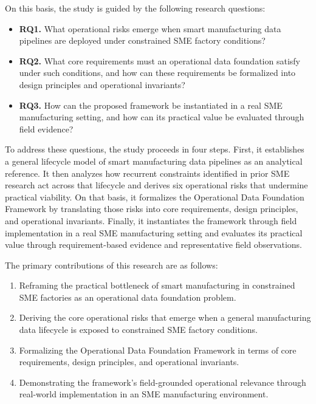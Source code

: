 \documentclass[systems,article,submit,pdftex,moreauthors]{Definitions/mdpi}
\begin{document}
On this basis, the study is guided by the following research questions:

\begin{itemize}
    \item \textbf{RQ1.} What operational risks emerge when smart manufacturing data pipelines are deployed under constrained SME factory conditions?
    \item \textbf{RQ2.} What core requirements must an operational data foundation satisfy under such conditions, and how can these requirements be formalized into design principles and operational invariants?
    \item \textbf{RQ3.} How can the proposed framework be instantiated in a real SME manufacturing setting, and how can its practical value be evaluated through field evidence?
\end{itemize}

To address these questions, the study proceeds in four steps. First, it establishes a general lifecycle model of smart manufacturing data pipelines as an analytical reference. It then analyzes how recurrent constraints identified in prior SME research act across that lifecycle and derives six operational risks that undermine practical viability. On that basis, it formalizes the Operational Data Foundation Framework by translating those risks into core requirements, design principles, and operational invariants. Finally, it instantiates the framework through field implementation in a real SME manufacturing setting and evaluates its practical value through requirement-based evidence and representative field observations.

The primary contributions of this research are as follows:

\begin{enumerate}
    \item Reframing the practical bottleneck of smart manufacturing in constrained SME factories as an operational data foundation problem.
    \item Deriving the core operational risks that emerge when a general manufacturing data lifecycle is exposed to constrained SME factory conditions.
    \item Formalizing the Operational Data Foundation Framework in terms of core requirements, design principles, and operational invariants.
    \item Demonstrating the framework's field-grounded operational relevance through real-world implementation in an SME manufacturing environment.
\end{enumerate}
\end{document}

